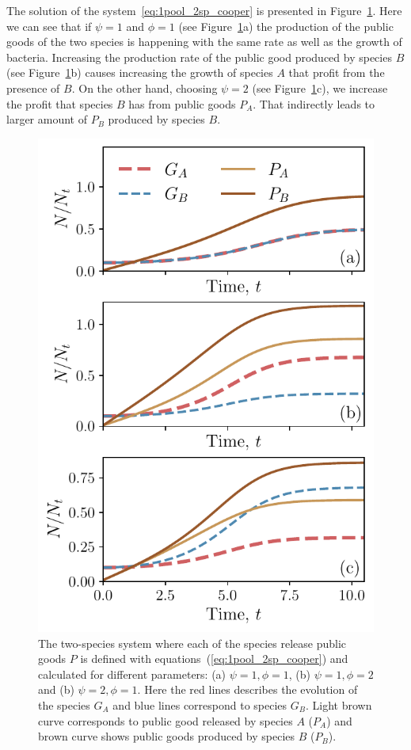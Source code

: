 \documentclass[10pt,A4paper]{article}
\numberwithin{equation}{section}
\begin{document}
%
The solution of the system~\ref{eq:1pool_2sp_cooper} is presented in Figure~\ref{fig:1pool_2sp_cooper}.
Here we can see that if $\psi=1$ and $\phi=1$ (see Figure~\ref{fig:1pool_2sp_cooper}a) the production of the public goods of the two species is happening with the same rate as well as the growth of bacteria.
Increasing the production rate of the public good produced by species $B$ (see Figure~\ref{fig:1pool_2sp_cooper}b) causes increasing the growth of species $A$ that profit from the presence of $B$.
On the other hand, choosing $\psi=2$ (see Figure~\ref{fig:1pool_2sp_cooper}c), we increase the profit that species $B$ has from public goods $P_A$.
That indirectly leads to larger amount of $P_B$ produced by species $B$.
\begin{figure}[H]
    \begin{center}
    \includegraphics[width=0.9\columnwidth]{Figures/pool_model_2sp_1pool_coop.pdf}
    \caption{
        The two-species system where each of the species release public goods $P$ is defined with equations~(\ref{eq:1pool_2sp_cooper}) and calculated for different parameters:
        (a) $\psi=1, \phi=1$, (b) $\psi=1, \phi=2$ and (b) $\psi=2, \phi=1$.
        Here the red lines describes the evolution of the species $G_A$ and blue lines correspond to species $G_B$.
        Light brown curve corresponds to public good released by species $A$ ($P_A$) and brown curve shows public goods produced by species $B$ ($P_B$).
    }
    \label{fig:1pool_2sp_cooper}
    \end{center}
\end{figure}
\end{document}
